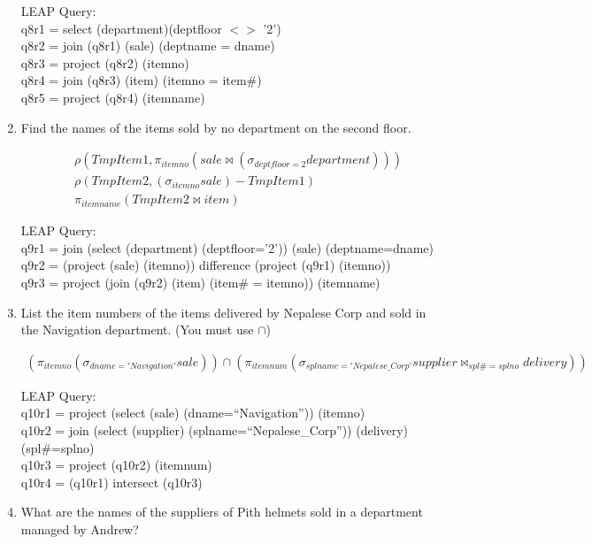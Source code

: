 \documentclass[10pt]{article}
\begin{document}
\begin{enumerate}
  LEAP Query:\\
  q8r1 = select (department)(deptfloor $<>$ '2')\\
  q8r2 = join (q8r1) (sale) (deptname = dname)\\
  q8r3 = project (q8r2) (itemno)\\
  q8r4 = join (q8r3) (item) (itemno = item\#)\\
  q8r5 = project (q8r4) (itemname)

\item Find the names of the items sold by no department on the second
  floor.

  \begin{align*}
    &\rho(TmpItem1, \pi_{itemno}(sale \bowtie (\sigma_{deptfloor =
      2}department)))\\
    &\rho(TmpItem2, (\sigma_{itemno}sale) - TmpItem1)\\
    &\pi_{itemname}(TmpItem2 \bowtie item)
  \end{align*}

  LEAP Query:\\
  q9r1 = join (select (department) (deptfloor='2')) (sale)
  (deptname=dname)\\
  q9r2 = (project (sale) (itemno)) difference (project (q9r1)
  (itemno))\\
  q9r3 = project (join (q9r2) (item) (item\# = itemno)) (itemname)

\item List the item numbers of the items delivered by Nepalese Corp
  and sold in the Navigation department. (You must use $\cap$)

  \begin{align*}
    (\pi_{itemno}(\sigma_{dname='Navigation'}sale)) \cap
    (\pi_{itemnum}(\sigma_{splname='Nepalese\_Corp'}supplier
    \bowtie_{spl\#=splno} delivery))
  \end{align*}

  LEAP Query:\\
  q10r1 = project (select (sale) (dname=``Navigation'')) (itemno)\\
  q10r2 = join (select (supplier) (splname=``Nepalese\_Corp''))
  (delivery) (spl\#=splno)\\
  q10r3 = project (q10r2) (itemnum)\\
  q10r4 = (q10r1) intersect (q10r3)

\item What are the names of the suppliers of Pith helmets sold in a
  department managed by Andrew?


\end{enumerate}
\end{document}
